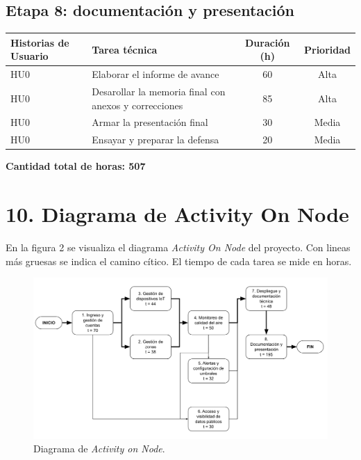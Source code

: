 \documentclass[
11pt, %
]{charter}
\begin{document}
\subsection*{Etapa 8: documentación y presentación}
\begin{tabular}{|p{2.5cm}|p{7.5cm}|c|c|}
\hline
\textbf{Historias de Usuario} & \textbf{Tarea técnica} & \textbf{Duración (h)} & \textbf{Prioridad} \\
\hline
HU0 & Elaborar el informe de avance & 60 & Alta \\
\hline
HU0 & Desarollar la memoria final con anexos y correcciones & 85 & Alta \\
\hline
HU0 & Armar la presentación final & 30 & Media \\
\hline
HU0 & Ensayar y preparar la defensa & 20 & Media \\
\hline

\end{tabular}

\vspace{10pt}
\textbf{Cantidad total de horas: 507}


\section{10. Diagrama de Activity On Node}
\label{sec:AoN}

En la figura 2 se visualiza el diagrama \textit{Activity On Node} del proyecto. Con lineas más gruesas se indica el camino cítico. El tiempo de cada tarea se mide en horas.

\begin{figure}[htpb]
\centering 
\includegraphics[width=1\textwidth]{./Figuras/fig_2-diagrama-AON.png}
\caption{Diagrama de \textit{Activity on Node}.}
\label{fig:AoN}
\end{figure}
\end{document}
